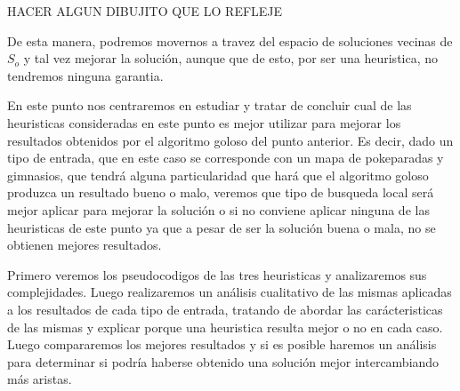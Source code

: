 HACER ALGUN DIBUJITO QUE LO REFLEJE
 
De esta manera, podremos movernos a travez del espacio de soluciones vecinas de $S_o$ y tal vez mejorar la solución, aunque que de esto, por ser una heuristica, no tendremos ninguna garantia.

En este punto nos centraremos en estudiar y tratar de concluir cual de las heuristicas consideradas en este punto es mejor utilizar para mejorar los resultados obtenidos por el algoritmo goloso del punto anterior. Es decir, dado un tipo de entrada, que en este caso se corresponde con un mapa de pokeparadas y gimnasios, que tendrá alguna particularidad que hará que el algoritmo goloso produzca un resultado bueno o malo, veremos que tipo de busqueda local será mejor aplicar para mejorar la solución o si no conviene aplicar ninguna de las heuristicas de este punto ya que a pesar de ser la solución buena o mala, no se obtienen mejores resultados.

Primero veremos los pseudocodigos de las tres heuristicas y analizaremos sus complejidades. Luego realizaremos un análisis cualitativo de las mismas aplicadas a los resultados de cada tipo de entrada, tratando de abordar las carácteristicas de las mismas y explicar porque una heuristica resulta mejor o no en cada caso. Luego compararemos los mejores resultados y si es posible haremos un análisis para determinar si podría haberse obtenido una solución mejor intercambiando más aristas.
